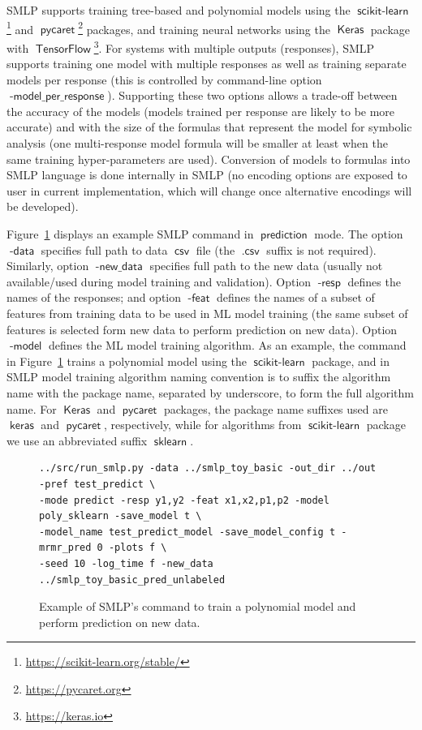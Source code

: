 \documentclass[a4paper,parskip=half]{article} %
\newcommand*\option[1]{\operatorname{\mathsf{#1}}} %
\newcommand*\suffix[1]{\operatorname{\mathsf{#1}}} %
\newcommand*\mode[1]{\operatorname{\mathsf{#1}}} %
\newcommand*\package[1]{\operatorname{\mathsf{#1}}} %
\begin{document}
SMLP supports training tree-based and polynomial models using the $\package{scikit-learn}$\footnote{\url{https://scikit-learn.org/stable/}} 
and $\package{pycaret}$\footnote{\url{https://pycaret.org}} packages, and training neural networks using the $\package{Keras}$ package 
with $\package{TensorFlow}$\footnote{\url{https://keras.io}}. For systems with multiple outputs (responses), SMLP supports training 
one model with multiple responses as well as training separate models per response  (this is controlled by command-line option 
$\option{-model\_per\_response}$). Supporting these two options allows a trade-off between the accuracy 
of the models (models trained per response are likely to be more accurate) and with the size of the formulas that represent the model for 
symbolic analysis (one multi-response model formula will be smaller at least when the same training hyper-parameters are used). 
Conversion of models to formulas into SMLP language is done internally in SMLP (no encoding options are exposed to user in current 
implementation, which will change once alternative encodings will be developed).

Figure~\ref{fig:pred:command} displays an example SMLP command in $\mode{prediction}$ mode.
The option $\option{-data}$ specifies full path to data $\suffix{csv}$ file (the $\suffix{.csv}$ suffix is not required).
Similarly, option $\option{-new\_data}$ specifies full path to the new data (usually not available/used during model training and validation).
Option $\option{-resp}$ defines the names of the responses;
and option $\option{-feat}$ defines the names of a subset of features from training data to be used in ML model training
(the same subset of features is selected form new data to perform prediction on new data).
Option $\option{-model}$ defines the ML model training algorithm. As an example, the command in Figure~\ref{fig:pred:command}
trains a polynomial model using the $\package{scikit-learn}$ package, and in SMLP model training algorithm naming convention is to
suffix the algorithm name with the package name, separated by underscore,  to form the full algorithm name.
For $\package{Keras}$ and $\package{pycaret}$ packages, the package name suffixes used are $\package{keras}$ and 
$\package{pycaret}$, respectively, while for algorithms from $\package{scikit-learn}$ package we use an 
abbreviated suffix $\package{sklearn}$.
\begin{figure}%
\begin{verbatim}
../src/run_smlp.py -data ../smlp_toy_basic -out_dir ../out -pref test_predict \
-mode predict -resp y1,y2 -feat x1,x2,p1,p2 -model poly_sklearn -save_model t \ 
-model_name test_predict_model -save_model_config t -mrmr_pred 0 -plots f \
-seed 10 -log_time f -new_data ../smlp_toy_basic_pred_unlabeled  

\end{verbatim}
\caption{Example of SMLP's command  to train a polynomial model and perform prediction on new data.}
\label{fig:pred:command}
\end{figure}
\end{document}
